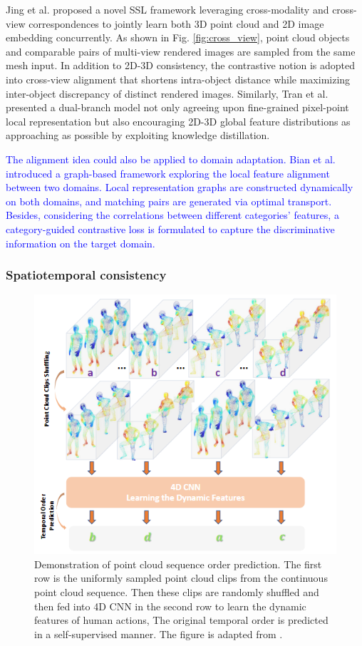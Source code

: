 \documentclass[a4paper,fleqn]{cas-dc}
\begin{document}
Jing et al. \citep{jing2021self} proposed a novel SSL framework leveraging cross-modality and cross-view correspondences to jointly learn both 3D point cloud and 2D image embedding concurrently. As shown in Fig. \ref{fig:cross_view}, point cloud objects and comparable pairs of multi-view rendered images are sampled from the same mesh input. In addition to 2D-3D consistency, the contrastive notion is adopted into cross-view alignment that shortens intra-object distance while maximizing inter-object discrepancy of distinct rendered images. Similarly, Tran et al. \citep{tran2022self} presented a dual-branch model not only agreeing upon fine-grained pixel-point local representation but also encouraging 2D-3D global feature distributions as approaching as possible by exploiting knowledge distillation.

\textcolor{blue}{The alignment idea could also be applied to domain adaptation. Bian et al. \citep{bian2022unsupervised} introduced a graph-based framework exploring the local feature alignment between two domains. Local representation graphs are constructed dynamically on both domains, and matching pairs are generated via optimal transport. Besides, considering the correlations between different categories' features, a category-guided contrastive loss is formulated to capture the discriminative information on the target domain.}



\subsubsection{Spatiotemporal consistency}
\begin{figure}[htbp]
    \centering
    \includegraphics[width=0.97\linewidth]{order_prediction.png}
    \caption{Demonstration of point cloud sequence order prediction. The first row is the uniformly sampled point cloud clips from the continuous point cloud sequence. Then these clips are randomly shuffled and then fed into 4D CNN in the second row to learn the dynamic features of human actions, The original temporal order is predicted in a self-supervised manner. The figure is adapted from \citep{wang2021self}.}  
    \label{fig:order_prediction}
\end{figure}
\end{document}
